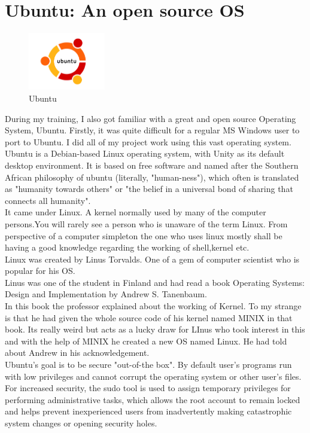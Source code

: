 
\section{Ubuntu: An open source OS}
\begin{figure}[!ht]
\centering
\includegraphics[width=0.3\textwidth]{input/images/ubuntu.png}                   
\caption{Ubuntu}
\hspace{-1.5em}
\end{figure}
During my training, I also got familiar with a great and open source Operating System, Ubuntu. Firstly, it was quite difficult for a regular MS Windows user to port to Ubuntu. I did all of my project work using this vast operating system. \\
Ubuntu is a Debian-based Linux operating system, with Unity as its default desktop environment. It is based on free software and named after the Southern African philosophy of ubuntu (literally, "human-ness"), which often is translated as "humanity towards others" or "the belief in a universal bond of sharing that connects all humanity".\\
It came under Linux. A kernel normally used by many of the computer persons.You will rarely see a person who is unaware of the term Linux. From perspective of a computer simpleton the one who uses linux mostly shall be having a good knowledge regarding the working of shell,kernel etc.\\

Linux was created by Linus Torvalds. One of a gem of computer scientist who is popular for his OS.\\
Linus was one of the student in Finland and had read a book Operating Systems: Design and Implementation by Andrew S. Tanenbaum.\\
In this book the professor explained about the working of Kernel. To my strange is that he had given the whole source code of his kernel named MINIX in that book. Its really weird but acts as a lucky draw for LInus who took interest in this and with the help of MINIX he created a new OS named Linux. He had told about Andrew in his acknowledgement.\\

Ubuntu's goal is to be secure "out-of-the box". By default user's programs run with low privileges and cannot corrupt the operating system or other user's files. For increased security, the sudo tool is used to assign temporary privileges for performing administrative tasks, which allows the root account to remain locked and helps prevent inexperienced users from inadvertently making catastrophic system changes or opening security holes.\\

